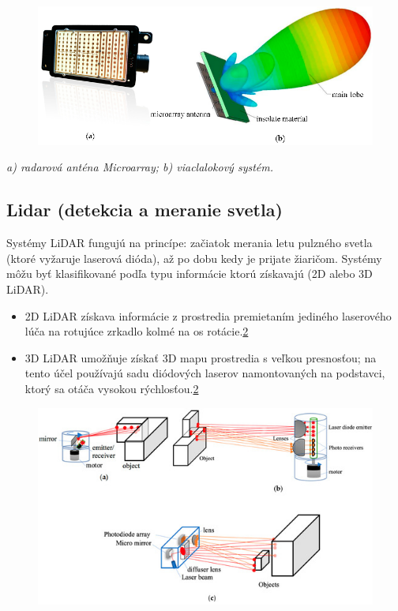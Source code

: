 \documentclass[10pt,oneside,slovak,a4paper]{article}
\begin{document}
\begin{figure}[!h]

\centering
\includegraphics[scale=1]{radar.png}
\label{fig:radar}
\end{figure}

\begin{center}
\centering
{
\emph{ a) radarová anténa Microarray; b) viaclalokový systém.}
}
\end{center}



\subsection{Lidar (detekcia a meranie svetla)}
Systémy LiDAR fungujú na princípe: začiatok merania letu pulzného svetla (ktoré vyžaruje laserová dióda), až po dobu kedy je prijate žiaričom. Systémy môžu byť klasifikované podľa typu informácie ktorú získavajú (2D alebo 3D LiDAR).\cite{s19030648}

\begin{itemize}
\item 2D LiDAR získava informácie z prostredia premietaním jediného laserového lúča na rotujúce zrkadlo kolmé na os rotácie.\ref{fig:lidar}

\item 3D LiDAR umožňuje získať 3D mapu prostredia s veľkou presnosťou; na tento účel používajú sadu diódových laserov namontovaných na podstavci, ktorý sa otáča vysokou rýchlosťou.\ref{fig:lidar}
\end{itemize}

\newpage

\begin{figure}[!h]
\centering
\includegraphics[scale=0.8]{lidar.jpg}

\label{fig:lidar}
\end{figure}
\end{document}
